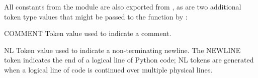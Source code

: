 All constants from the  module are also exported from
, as are two additional token type values that might be
passed to the  function by :

\begin{datadesc}{COMMENT}
  Token value used to indicate a comment.
\end{datadesc}
\begin{datadesc}{NL}
  Token value used to indicate a non-terminating newline.  The NEWLINE
  token indicates the end of a logical line of Python code; NL tokens
  are generated when a logical line of code is continued over multiple
  physical lines.
\end{datadesc}
